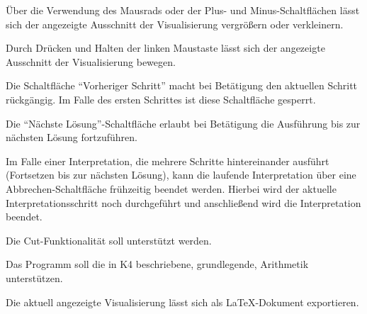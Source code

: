 \documentclass[parskip=full,11pt,twoside]{scrartcl}
\begin{document}

Über die Verwendung des Mausrads oder der Plus- und Minus-Schaltflächen lässt sich der angezeigte Ausschnitt der Visualisierung vergrößern oder verkleinern.


Durch Drücken und Halten der linken Maustaste lässt sich der angezeigte Ausschnitt der Visualisierung bewegen.


Die Schaltfläche \enquote{Vorheriger Schritt} macht bei Betätigung den aktuellen Schritt rückgängig. Im Falle des ersten Schrittes ist diese Schaltfläche gesperrt.


Die \enquote{Nächste Lösung}-Schaltfläche erlaubt bei Betätigung die Ausführung bis zur nächsten Lösung fortzuführen.


Im Falle einer Interpretation, die mehrere Schritte hintereinander ausführt (Fortsetzen bis zur nächsten Lösung), kann die laufende Interpretation über eine Abbrechen-Schaltfläche frühzeitig beendet werden. Hierbei wird der aktuelle Interpretationsschritt noch durchgeführt und anschließend wird die Interpretation beendet.


Die Cut-Funktionalität soll unterstützt werden.


Das Programm soll die in K4 beschriebene, grundlegende, Arithmetik unterstützen.


Die aktuell angezeigte Visualisierung lässt sich als LaTeX-Dokument exportieren.

\end{document}
